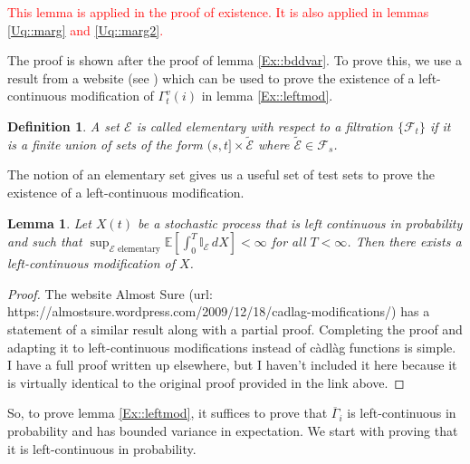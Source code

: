 \documentclass[12pt]{article}
\newcommand{\mb}{\mathbb}
\newcommand{\mc}{\mathcal}
\newcommand{\ov}{\overline}
\newcommand{\te}{\text}
\newcommand{\tr}{\textcolor{red}}
\newcommand{\ind}{\hspace{24pt}}
\newcommand{\ex}[1]{\mb{E}\left[#1\right]}			%
\newcommand{\Xf}{X}									%
\newcommand{\F}{\mc{F}}								%
\newcommand{\tme}[1]{(#1)}							%
\newcommand{\vpara}[1]{^{#1}}						%
\newcommand{\stpara}[1]{_{#1}}						%
\newcommand{\tpara}[1]{_{#1}}						%
\newcommand{\evnt}{\mc{E}}						%
\newcommand{\alt}[1]{\tilde{#1}}					%
\newcommand{\ratee}{\Gamma}							%
\newcommand{\grate}{\ov{\ratee}}					%
\newtheorem{lem}[thms]{Lemma}
\newtheorem{defn}[thms]{Definition}
\begin{document}
\tr{This lemma is applied in the proof of existence. It is also applied in lemmas \ref{Uq::marg} and \ref{Uq::marg2}.}

\ind The proof is shown after the proof of lemma \ref{Ex::bddvar}. To prove this, we use a result from a website (see \cite[section \ref{F-not::p}]{F}) which can be used to prove the existence of a left-continuous modification of \(\ratee\vpara{v}\tpara{t}(i)\) in lemma \ref{Ex::leftmod}.

\begin{defn}
A set \(\evnt\) is called elementary with respect to a filtration \(\{\F\tpara{t}\}\) if it is a finite union of sets of the form \((s,t]\times \alt{\evnt}\) where \(\alt{\evnt} \in \F\tpara{s}\).
\label{Ex::elementary}
\end{defn}

The notion of an elementary set gives us a useful set of test sets to prove the existence of a left-continuous modification. 

\begin{lem}
Let \(\Xf\tme{t}\) be a stochastic process that is left continuous in probability and such that \(\sup_{\evnt\te{ elementary}}\ex{\int_0^T \mb{I}_\evnt\,d\Xf} < \infty\) for all \(T < \infty\). Then there exists a left-continuous modification of \(\Xf\).
\label{Ex::leftmodgen}
\end{lem}
\begin{proof}
The website Almost Sure (url: https://almostsure.wordpress.com/2009/12/18/cadlag-modifications/) has a statement of a similar result along with a partial proof. Completing the proof and adapting it to left-continuous modifications instead of c\`adl\`ag functions is simple. I have a full proof written up elsewhere, but I haven't included it here because it is virtually identical to the original proof provided in the link above.
\end{proof}

So, to prove lemma \ref{Ex::leftmod}, it suffices to prove that \(\grate\stpara{i}\) is left-continuous in probability and has bounded variance in expectation. We start with proving that it is left-continuous in probability.
\end{document}
